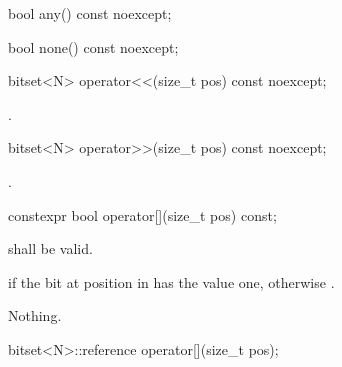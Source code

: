 %
\begin{itemdecl}
bool any() const noexcept;
\end{itemdecl}

\begin{itemdescr}
\pnum
\returns {}
\end{itemdescr}

%
\begin{itemdecl}
bool none() const noexcept;
\end{itemdecl}

\begin{itemdescr}
\pnum
\returns {}
\end{itemdescr}

%
\begin{itemdecl}
bitset<N> operator<<(size_t pos) const noexcept;
\end{itemdecl}

\begin{itemdescr}
\pnum
\returns
{}.
\end{itemdescr}

%
\begin{itemdecl}
bitset<N> operator>>(size_t pos) const noexcept;
\end{itemdecl}

\begin{itemdescr}
\pnum
\returns
{}.
\end{itemdescr}

%
\begin{itemdecl}
constexpr bool operator[](size_t pos) const;
\end{itemdecl}

\begin{itemdescr}
\pnum
\requires
{} shall be valid.

\pnum
\returns
{} if the bit at position  in  has the value
one, otherwise .

\pnum
\throws Nothing.
\end{itemdescr}

%
\begin{itemdecl}
bitset<N>::reference operator[](size_t pos);
\end{itemdecl}


